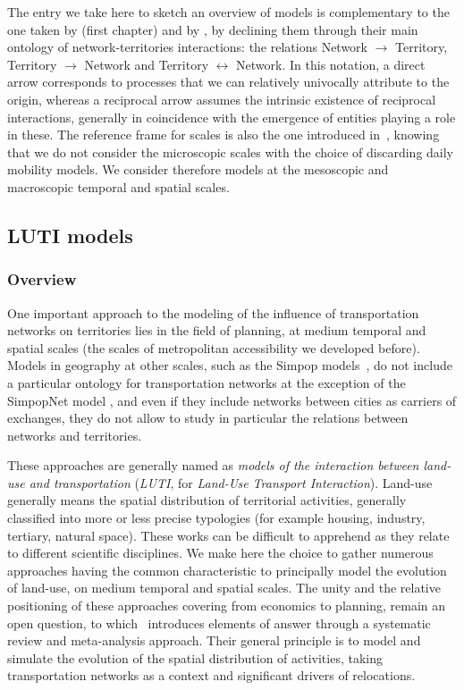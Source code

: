 \documentclass[10pt]{article}
\begin{document}
The entry we take here to sketch an overview of models is complementary to the one taken by \cite{raimbault2018caracterisation} (first chapter) and by \cite{raimbault2020systematic}, by declining them through their main ontology of network-territories interactions: the relations Network $\rightarrow$ Territory, Territory $\rightarrow$ Network and Territory $\leftrightarrow$ Network. In this notation, a direct arrow corresponds to processes that we can relatively univocally attribute to the origin, whereas a reciprocal arrow assumes the intrinsic existence of reciprocal interactions, generally in coincidence with the emergence of entities playing a role in these. The reference frame for scales is also the one introduced in~\cite{raimbault2018caracterisation}, knowing that we do not consider the microscopic scales with the choice of discarding daily mobility models. We consider therefore models at the mesoscopic and macroscopic temporal and spatial scales.


\subsection{LUTI models}

\subsubsection{Overview}

One important approach to the modeling of the influence of transportation networks on territories lies in the field of planning, at medium temporal and spatial scales (the scales of metropolitan accessibility we developed before). Models in geography at other scales, such as the Simpop models~\cite{pumain2012multi}, do not include a particular ontology for transportation networks at the exception of the SimpopNet model \cite{schmitt2014modelisation}, and even if they include networks between cities as carriers of exchanges, they do not allow to study in particular the relations between networks and territories.

These approaches are generally named as \emph{models of the interaction between land-use and transportation} (\emph{LUTI}, for \textit{Land-Use Transport Interaction}). Land-use generally means the spatial distribution of territorial activities, generally classified into more or less precise typologies (for example housing, industry, tertiary, natural space). These works can be difficult to apprehend as they relate to different scientific disciplines. We make here the choice to gather numerous approaches having the common characteristic to principally model the evolution of land-use, on medium temporal and spatial scales. The unity and the relative positioning of these approaches covering from economics to planning, remain an open question, to which~\cite{raimbault2020systematic} introduces elements of answer through a systematic review and meta-analysis approach. Their general principle is to model and simulate the evolution of the spatial distribution of activities, taking transportation networks as a context and significant drivers of relocations.
\end{document}
